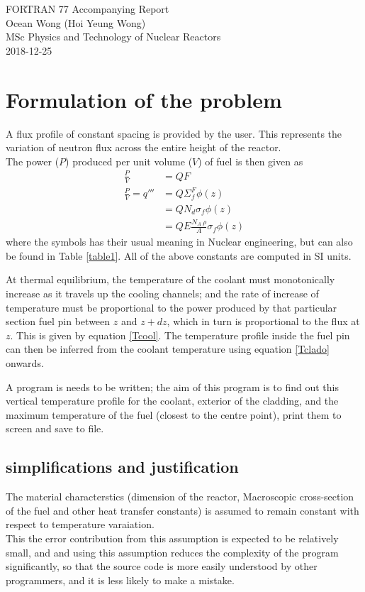\documentclass[a4paper, 12pt]{article}
\begin{document}
\begin{center}
FORTRAN 77 Accompanying Report					\\
Ocean Wong (Hoi Yeung Wong)						\\
MSc Physics and Technology of Nuclear Reactors	\\
2018-12-25										\\
\end{center}

\section{Formulation of the problem}
A flux profile of constant spacing is provided by the user. This represents the variation of neutron flux across the entire height of the reactor.\\
The power ($P$) produced per unit volume ($V$) of fuel is then given as
\begin{align}
\frac{P}{V} &=  Q F  							\label{FirstEq} \\
\frac{P}{V} =q''' &= Q \Sigma_f^F \phi(z)						\\
  &= Q N_d \sigma_f \phi(z) 						\\
  &= Q E \frac{N_A \:\rho}{A} \sigma_f \phi(z) \label{ExpandedQ'''}
\end{align}
where the symbols has their usual meaning in Nuclear engineering, but can also be found in Table \ref{table1}.
All of the above constants are computed in SI units.

At thermal equilibrium, the temperature of the coolant must monotonically increase as it travels up the cooling channels; and the rate of increase of temperature must be proportional to the power produced by that particular section fuel pin between $z$ and $z+dz$, which in turn is proportional to the flux at $z$. This is given by equation \ref{Tcool}. The temperature profile inside the fuel pin can then be inferred from the coolant temperature using equation \ref{Tclado} onwards.

A program is needs to be written; the aim of this program is to find out this vertical temperature profile for the coolant, exterior of the cladding, and the maximum temperature of the fuel (closest to the centre point), print them to screen and save to file.

\subsection{simplifications and justification}
The material characterstics (dimension of the reactor, Macroscopic cross-section of the fuel and other heat transfer constants) is assumed to remain constant with respect to temperature varaiation.\\
This the error contribution from this assumption is expected to be relatively small, and and using this assumption reduces the complexity of the program significantly, so that the source code is more easily understood by other programmers, and it is less likely to make a mistake.
\end{document}
